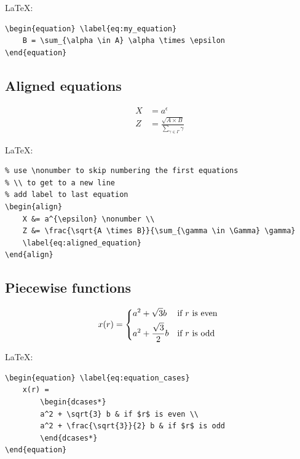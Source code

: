 \documentclass[12pt,nonacm,acmlarge,titlepage,screen]{acmart}
\begin{document}
\noindent\LaTeX:
\begin{Verbatim}[frame=single]
\begin{equation} \label{eq:my_equation}
    B = \sum_{\alpha \in A} \alpha \times \epsilon
\end{equation}
\end{Verbatim}

\subsection*{Aligned equations}

\begin{align}
    X &= a^{\epsilon} \nonumber \\
    Z &= \frac{\sqrt{A \times B}}{\sum_{\gamma \in \Gamma} \gamma} 
    \label{eq:aligned_equation}
\end{align}

\noindent\LaTeX:
\begin{Verbatim}[frame=single]
% use &= to define the alignment
% use \nonumber to skip numbering the first equations
% \\ to get to a new line
% add label to last equation
\begin{align}
    X &= a^{\epsilon} \nonumber \\
    Z &= \frac{\sqrt{A \times B}}{\sum_{\gamma \in \Gamma} \gamma}
    \label{eq:aligned_equation}
\end{align}
\end{Verbatim}

\subsection*{Piecewise functions}

\begin{equation} \label{eq:equation_cases}
    x(r) =
        \begin{dcases*}
		a^2 + \sqrt{3} b & if $r$ is even \\
		a^2 + \frac{\sqrt{3}}{2} b & if $r$ is odd
		\end{dcases*}
\end{equation}

\noindent\LaTeX:
\begin{Verbatim}[frame=single]
\begin{equation} \label{eq:equation_cases}
    x(r) =
        \begin{dcases*}
        a^2 + \sqrt{3} b & if $r$ is even \\
        a^2 + \frac{\sqrt{3}}{2} b & if $r$ is odd
        \end{dcases*}
\end{equation}
\end{Verbatim}
\end{document}
